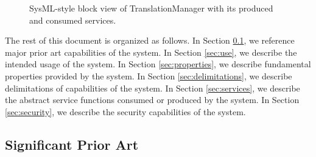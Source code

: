 \documentclass[a4paper]{arrowhead}
\begin{document}
\begin{figure}[ht!]
  \centering
  \caption{SysML-style block view of TranslationManager with its produced and consumed services.}
  \label{fig:system}
\end{figure}

The rest of this document is organized as follows.
In Section \ref{sec:prior_art}, we reference major prior art capabilities of the system.
In Section \ref{sec:use}, we describe the intended usage of the system.
In Section \ref{sec:properties}, we describe fundamental properties provided by the system.
In Section \ref{sec:delimitations}, we describe delimitations of capabilities of the system.
In Section \ref{sec:services}, we describe the abstract service functions consumed or produced by the system.
In Section \ref{sec:security}, we describe the security capabilities of the system.

\newpage

\subsection{Significant Prior Art}
\label{sec:prior_art}
\end{document}
